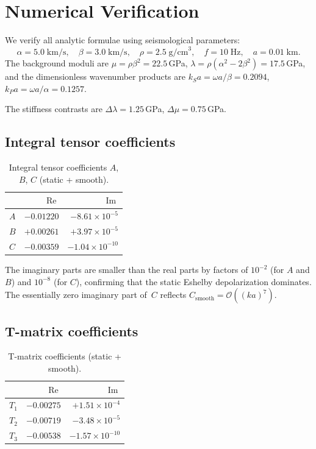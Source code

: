 \documentclass[11pt,a4paper]{article}
\newcommand{\order}[1]{\mathcal{O}\!\left(#1\right)}
\newcommand{\Dlam}{\Delta\lambda}
\newcommand{\Dmu}{\Delta\mu}
\newcommand{\re}{\operatorname{Re}}
\newcommand{\im}{\operatorname{Im}}
\begin{document}
\section{Numerical Verification}
\label{sec:numerical}

We verify all analytic formulae using seismological parameters:
\begin{equation*}
  \alpha = 5.0\;\text{km/s}, \quad
  \beta = 3.0\;\text{km/s}, \quad
  \rho = 2.5\;\text{g/cm}^3, \quad
  f = 10\;\text{Hz}, \quad
  a = 0.01\;\text{km}.
\end{equation*}
The background moduli are
$\mu = \rho\beta^2 = 22.5$\,GPa,
$\lambda = \rho(\alpha^2 - 2\beta^2) = 17.5$\,GPa,
and the dimensionless wavenumber products are
$k_S a = \omega a/\beta = 0.2094$,
$k_P a = \omega a/\alpha = 0.1257$.

The stiffness contrasts are $\Dlam = 1.25$\,GPa,
$\Dmu = 0.75$\,GPa.

\subsection{Integral tensor coefficients}

\begin{table}[ht]
\centering
\caption{Integral tensor coefficients $A$, $B$, $C$ (static + smooth).}
\label{tab:ABC}
\begin{tabular}{@{}lrr@{}}
\toprule
 & $\re$ & $\im$ \\
\midrule
$A$ & $-0.01220$ & $-8.61 \times 10^{-5}$ \\
$B$ & $+0.00261$ & $+3.97 \times 10^{-5}$ \\
$C$ & $-0.00359$ & $-1.04 \times 10^{-10}$ \\
\bottomrule
\end{tabular}
\end{table}

\noindent
The imaginary parts are smaller than the real parts by factors of
$10^{-2}$ (for $A$ and $B$) and $10^{-8}$ (for $C$), confirming
that the static Eshelby depolarization dominates. The
essentially zero imaginary part of~$C$ reflects
$C_\text{smooth} = \order{(ka)^7}$.

\subsection{T-matrix coefficients}

\begin{table}[ht]
\centering
\caption{T-matrix coefficients (static + smooth).}
\label{tab:Tmatrix}
\begin{tabular}{@{}lrr@{}}
\toprule
 & $\re$ & $\im$ \\
\midrule
$T_1$ & $-0.00275$ & $+1.51 \times 10^{-4}$ \\
$T_2$ & $-0.00719$ & $-3.48 \times 10^{-5}$ \\
$T_3$ & $-0.00538$ & $-1.57 \times 10^{-10}$ \\
\bottomrule
\end{tabular}
\end{table}
\end{document}
